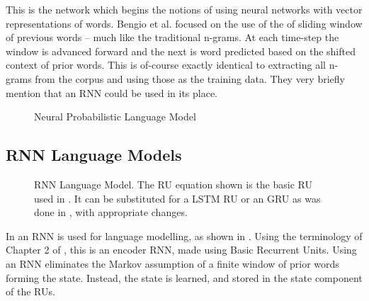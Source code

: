 {This is the network which begins the notions of using neural networks with vector representations of words.
Bengio et al. focused on the use of the of sliding window of previous words -- much like the traditional n-grams.
At each time-step the window is advanced forward and the next is word predicted based on the shifted context of prior words.
This is of-course exactly identical to extracting all n-grams from the corpus and using those as the training data.
They very briefly mention that an RNN could be used in its place.

\begin{figure}
	\caption{Neural Probabilistic Language Model}
	\label{fig:neural-language-model}
	\centering
	 
\end{figure}


\subsection{RNN Language Models}
\begin{figure}
	\caption{RNN Language Model. The RU equation shown is the basic RU used in \textcite{mikolov2010recurrent}.
	It can be substituted for a LSTM RU or an GRU as was done in \textcite{sundermeyer2012lstm,jozefowicz2015empirical}, with appropriate changes.
	}
	\label{fig:rnn-neural-language-model}
	\centering
	\resizebox{\textwidth}{!}{}
\end{figure}


In  an RNN is used for language modelling, as shown in .
Using the terminology of Chapter 2 of , this is an encoder RNN, made using Basic Recurrent Units.
Using an RNN eliminates the Markov assumption of a finite window of prior words forming the state.
Instead, the state is learned, and stored in the state component of the RUs. 

}

